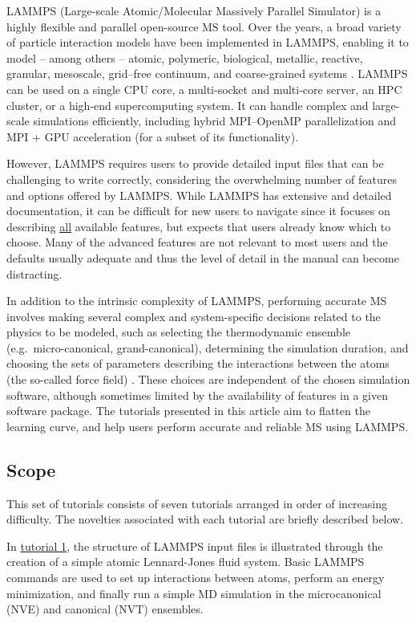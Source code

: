 \documentclass[9pt,tutorial]{livecoms}
\renewcommand{\emph}[1]{\underline{#1}}
\begin{document}
LAMMPS (Large-scale Atomic/Molecular Massively Parallel Simulator)
\cite{lammps_home} is a highly flexible and parallel open-source MS
tool.  Over the years, a broad variety of particle interaction models
have been implemented in LAMMPS, enabling it to model -- among others --
atomic, polymeric, biological, metallic, reactive, granular, mesoscale,
grid--free continuum, and coarse-grained systems
\cite{thompson2022lammps}.  LAMMPS can be used on a single CPU core, a
multi-socket and multi-core server, an HPC cluster, or a high-end
supercomputing system.  It can handle complex and large-scale
simulations efficiently, including hybrid MPI--OpenMP parallelization
and MPI + GPU acceleration (for a subset of its functionality).

However, LAMMPS requires users to provide detailed input files that can
be challenging to write correctly, considering the overwhelming number
of features and options offered by LAMMPS.  While LAMMPS has
extensive and detailed documentation, it can be difficult for new users
to navigate since it focuses on describing \emph{all} available
features, but expects that users already know which to choose.  Many of
the advanced features are not relevant to most users and the defaults
usually adequate and thus the level of detail in the manual can become
distracting.

In addition to the intrinsic complexity of LAMMPS, performing accurate
MS involves making several complex and system-specific decisions related
to the physics to be modeled, such as selecting the thermodynamic
ensemble (e.g.~micro-canonical, grand-canonical), determining the
simulation duration, and choosing the sets of parameters describing the
interactions between the atoms (the so-called force field)
\cite{van2018validation}.  These choices are independent of the chosen
simulation software, although sometimes limited by the availability of
features in a given software package.  The tutorials presented in this
article aim to flatten the learning curve, and help users perform
accurate and reliable MS using LAMMPS.

\subsection{Scope}

This set of tutorials consists of seven tutorials arranged in order of
increasing difficulty.  The novelties associated with each tutorial are
briefly described below.

In \hyperref[lennard-jones-label]{tutorial 1}, the structure of LAMMPS
input files is illustrated through the creation of a simple atomic
Lennard-Jones fluid system.  Basic LAMMPS commands are used to set up
interactions between atoms, perform an energy minimization, and finally
run a simple MD simulation in the microcanonical (NVE) and canonical (NVT)
ensembles.
\end{document}
